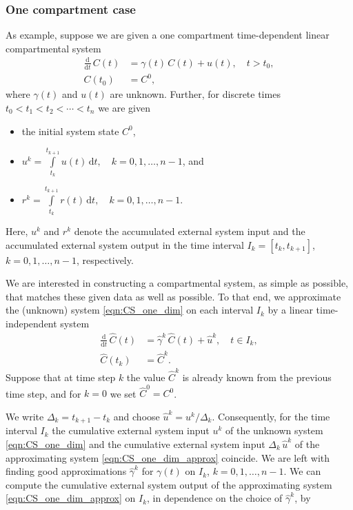 \documentclass[draft]{agujournal2019}
\newcommand{\deriv}[1]{\frac{\mathrm{d}}{\mathrm{d}#1}}
\newcommand{\dd}[1]{\,\mathrm{d}#1}
\newcommand{\intl}{\int\limits}
\begin{document}
    \subsubsection{One compartment case}
        As example, suppose we are given a one compartment time-dependent linear compartmental system
        \begin{equation}\label{eqn:CS_one_dim}
            \begin{aligned}
                \deriv{t}\,C(t) &= \gamma(t)\,C(t) + u(t),\quad t>t_0,\\
                C(t_0) &= C^0,
            \end{aligned}
        \end{equation}
        where $\gamma(t)$ and $u(t)$ are unknown.
        Further, for discrete times $t_0<t_1<t_2<\cdots<t_n$ we are given
        \begin{itemize}
            \item the initial system state $C^0$,
            \item $u^k = \intl_{t_k}^{t_{k+1}} u(t)\dd{t},\quad k=0,1,\ldots,n-1$, and
            \item $r^k = \intl_{t_k}^{t_{k+1}} r(t)\dd{t},\quad k=0,1,\ldots,n-1$.
        \end{itemize}
        Here, $u^k$ and $r^k$ denote the accumulated external system input and the accumulated external system output in the time interval $I_k=[t_k,t_{k+1}]$, $k=0,1,\ldots,n-1$, respectively.

        We are interested in constructing a compartmental system, as simple as possible, that matches these given data as well as possible.
        To that end, we approximate the (unknown) system \eqref{eqn:CS_one_dim} on each interval $I_k$ by a linear time-independent system
        \begin{equation}\label{eqn:CS_one_dim_approx}
            \begin{aligned}
                \deriv{t}\,\widehat{C}(t) &= \widehat{\gamma}^k\,\widehat{C}(t) + \widehat{u}^k,\quad t\in I_k,\\
                \widehat{C}(t_k) &= \widehat{C}^k.
            \end{aligned}
        \end{equation}
        Suppose that at time step $k$ the value $\widehat{C}^k$ is already known from the previous time step,
        and for $k=0$ we set $\widehat{C}^0=C^0$.
        
        We write $\Delta_k=t_{k+1}-t_k$ and choose $\widehat{u}^k=u^k/\Delta_k$.
        Consequently, for the time interval $I_k$ the cumulative external system input $u^k$ of the unknown system \eqref{eqn:CS_one_dim} and the cumulative external system input $\Delta_k\,\widehat{u}^k$ of the approximating system \eqref{eqn:CS_one_dim_approx} coincide.
        We are left with finding good approximations $\widehat{\gamma}^k$ for $\gamma(t)$ on $I_k$, $k=0,1,\ldots,n-1$.
        We can compute the cumulative external system output of the approximating system \eqref{eqn:CS_one_dim_approx} on $I_k$, in dependence on the choice of $\widehat{\gamma}^k$, by
        
\end{document}
